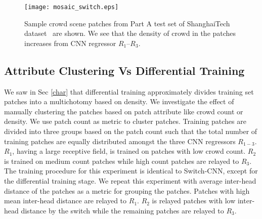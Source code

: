 \documentclass[10pt,twocolumn,letterpaper]{article}
\begin{document}
\begin{figure}[!t]
   \vspace{-.3cm}
 \texttt{[image: mosaic\_switch.eps]}\hspace{0.3cm}%
 \caption{Sample crowd scene patches from Part A test set of ShanghaiTech dataset~\cite{zhang2016single} are shown. We see that the density of crowd in the patches increases from CNN regressor $R_1$--$R_3$.}
\label{mosaic_switch}
\end{figure}


\subsection{Attribute Clustering Vs Differential Training}

We saw in Sec \ref{char} that differential training approximately divides
training set patches into a multichotomy based on density. We investigate the effect of manually clustering the patches based on patch attribute like crowd count or density. We use patch count as metric to cluster patches.
Training patches are divided into three groups based on the patch
count such that the total number of training patches are equally distributed amongst the three CNN regressors $R_{1-3}$.
$R_1$, having a large receptive field, is trained on patches with low
crowd count. $R_2$ is trained on medium count patches while high count
patches are relayed to $R_3$. The training procedure for this experiment is identical to Switch-CNN, except for the differential training stage. We repeat this 
experiment with average inter-head distance of the patches as a metric for grouping the patches. Patches with high mean inter-head distance are relayed
to $R_1$. $R_2$ is relayed patches with low inter-head distance by the switch
while the remaining patches are relayed to $R_3$. 
\begin{table}[!h]
\begin{centering}

\par\end{centering}
\vspace*{1.2mm}
\caption{Comparison of MAE for Switch-CNN and manual clustering of patches based on patch attributes on Part A of the ShanghaiTech dataset~\cite{zhang2016single}.}
\label{man}
\end{table}
\end{document}
